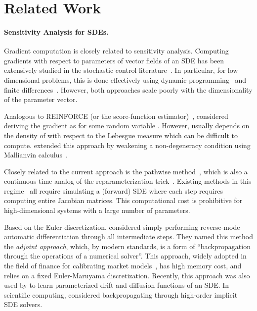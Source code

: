 \documentclass[twoside]{article}
\begin{document}
\section{Related Work}



\paragraph{Sensitivity Analysis for SDEs.}
Gradient computation is closely related to sensitivity analysis. 
Computing gradients with respect to parameters of vector fields of an SDE has been extensively studied in the stochastic control literature~\citep{kushner2013numerical}.
In particular, for low dimensional problems, this is done effectively using dynamic programming~\cite{baxterr2001infinite} and finite differences~\cite{glasserman1992some,l1994convergence}.
However, both approaches scale poorly with the dimensionality of the parameter vector. 

Analogous to REINFORCE (or the score-function estimator)~\citep{williams1992simple,kleijnen1996optimization,glynn1990likelihood}, \citet{yang1991monte} considered deriving the gradient as  for some random variable . However,  usually depends on the density of  with respect to the Lebesgue measure which can be difficult to compute.
\citet{gobet2005sensitivity} extended this approach by weakening a non-degeneracy condition using Mallianvin calculus~\cite{nourdin2012normal}.

Closely related to the current approach is the pathwise method~\cite{yang1991monte}, which is also a continuous-time analog of the reparameterization trick~\citep{kingma2013auto,rezende2014stochastic}. Existing methods in this regime~\citep{tzen2019neural,gobet2005sensitivity,liu2019neural} all require simulating a (forward) SDE where each step requires computing entire Jacobian matrices. This computational cost is prohibitive for high-dimensional systems with a large number of parameters.

Based on the Euler discretization, \citet{giles2006smoking} considered simply performing reverse-mode automatic differentiation through all intermediate steps.
They named this method the \textit{adjoint approach}, which, by modern standards, is a form of ``backpropagation through the operations of a numerical solver''. This approach, widely adopted in the field of finance for calibrating market models~\cite{giles2006smoking}, has high memory cost, and relies on a fixed Euler-Maruyama discretization. 
Recently, this approach was also used by \citet{hegde2019deep} to learn parameterized drift and diffusion functions of an SDE.
In scientific computing, \citet{innes2019zygote} considered backpropagating through high-order implicit SDE solvers.
\end{document}

